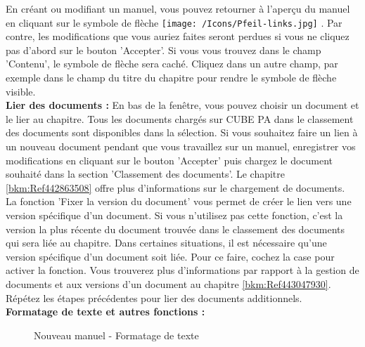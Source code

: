 En créant ou modifiant un manuel, vous pouvez retourner à l'aperçu du manuel en cliquant sur le symbole de flèche \texttt{[image: /Icons/Pfeil-links.jpg]} . Par contre, les modifications que vous auriez faites seront perdues si vous ne cliquez pas d'abord sur le bouton 'Accepter'. Si vous vous trouvez dans le champ 'Contenu', le symbole de flèche sera caché. Cliquez dans un autre champ, par exemple dans le champ du titre du chapitre pour rendre le symbole de flèche visible. \\

\textbf{Lier des documents :} En bas de la fenêtre, vous pouvez choisir un document et le lier au chapitre. Tous les documents chargés sur CUBE PA dans le classement des documents sont disponibles dans la sélection. Si vous souhaitez faire un lien à un nouveau document pendant que vous travaillez sur un manuel, enregistrer vos modifications en cliquant sur le bouton 'Accepter' puis chargez le document souhaité dans la section 'Classement des documents'. Le chapitre \ref{bkm:Ref442863508} offre plus d'informations sur le chargement de documents. \\

La fonction 'Fixer la version du document'  vous permet de créer le lien vers une version spécifique d'un document. Si vous n'utilisez pas cette fonction, c'est la version la plus récente du document trouvée dans le classement des documents qui sera liée au chapitre. Dans certaines situations, il est nécessaire qu'une version spécifique d'un document soit liée. Pour ce faire, cochez la case pour activer la fonction. Vous trouverez plus d'informations par rapport à la gestion de documents et aux versions d'un document au chapitre \ref{bkm:Ref443047930}. \\

Répétez les étapes précédentes pour lier des documents additionnels. \\

\textbf{Formatage de texte et autres fonctions :}

\begin{figure}[H]
\caption{Nouveau manuel - Formatage de texte}
\end{figure}

